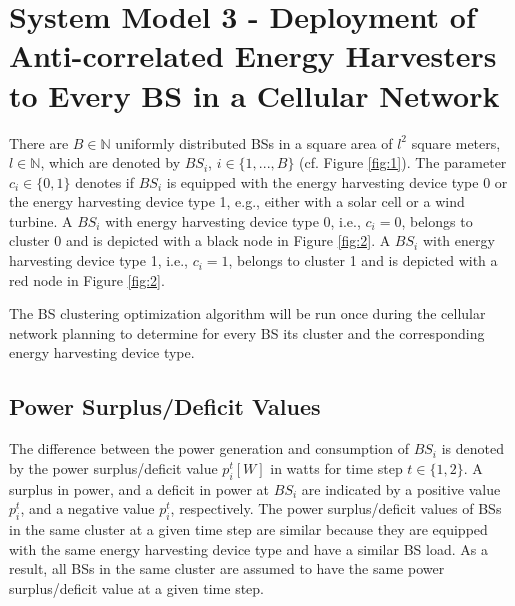 \section[System Model 3 - Deployment of Anti-correlated Energy Harvesters]{System Model 3 - Deployment of Anti-correlated Energy Harvesters to Every BS in a Cellular Network\label{system_model_3} }


There are $B \in \mathbb{N}$ uniformly distributed BSs in a square area of $l^2$ square meters, $l \in \mathbb{N}$, which are denoted by $BS_i$, $i\in\{1,...,B\}$ (cf. Figure \ref{fig:1}). The parameter $c_i\in\{0,1\}$ denotes if $BS_i$ is equipped with the energy harvesting device type 0 or the energy harvesting device type 1, e.g., either with a solar cell or a wind turbine. A $BS_i$ with energy harvesting device type 0, i.e., $c_i=0$, belongs to cluster 0 and is depicted with a black node in Figure \ref{fig:2}. A $BS_i$ with energy harvesting device type 1, i.e., $c_i=1$, belongs to cluster 1 and is depicted with a red node in Figure \ref{fig:2}. 


The BS clustering optimization algorithm will be run once during the cellular network planning to determine for every BS its cluster and the corresponding energy harvesting device type.

\subsection{Power Surplus/Deficit Values}


The difference between the power generation and consumption of $BS_i$ is denoted by the power surplus/deficit value $p_i^t [W]$ in watts for time step $t\in\{1,2\}$. A surplus in power, and a deficit in power at $BS_i$ are indicated by a positive value $p_i^t$, and a negative value $p_i^t$, respectively. The power surplus/deficit values of BSs in the same cluster at a given time step are similar because they are equipped with the same energy harvesting device type and have a similar BS load. As a result, all BSs in the same cluster are assumed to have the same power surplus/deficit value at a given time step.



